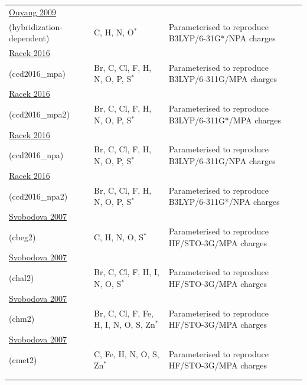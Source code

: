 \documentclass[oneside]{memoir}
\begin{document}
\begin{longtable}{p{4cm} p{3.3cm} p{8cm}}
\addlinespace[5pt]\midrule\addlinespace[5pt] \href{https://doi.org/10.1039/b821696g}{Ouyang 2009}\\(hybridization-dependent) & C, H, N, O$^{*}$ & Parameterised to reproduce B3LYP/6-31G*/NPA charges \\
\addlinespace[5pt]\midrule\addlinespace[5pt] \href{https://doi.org/10.1186/s13321-016-0171-1}{Racek 2016}\\(ccd2016\_mpa) & Br, C, Cl, F, H, N, O, P, S$^{*}$ & Parameterised to reproduce B3LYP/6-311G/MPA charges \\
\addlinespace[5pt]\midrule\addlinespace[5pt] \href{https://doi.org/10.1186/s13321-016-0171-1}{Racek 2016}\\(ccd2016\_mpa2) & Br, C, Cl, F, H, N, O, P, S$^{*}$ & Parameterised to reproduce B3LYP/6-311G*/MPA charges \\
\addlinespace[5pt]\midrule\addlinespace[5pt] \href{https://doi.org/10.1186/s13321-016-0171-1}{Racek 2016}\\(ccd2016\_npa) & Br, C, Cl, F, H, N, O, P, S$^{*}$ & Parameterised to reproduce B3LYP/6-311G/NPA charges \\
\addlinespace[5pt]\midrule\addlinespace[5pt] \href{https://doi.org/10.1186/s13321-016-0171-1}{Racek 2016}\\(ccd2016\_npa2) & Br, C, Cl, F, H, N, O, P, S$^{*}$ & Parameterised to reproduce B3LYP/6-311G*/NPA charges \\
\addlinespace[5pt]\midrule\addlinespace[5pt] \href{https://doi.org/10.3390/i8070572}{Svobodova 2007}\\(cbeg2) & C, H, N, O, S$^{*}$ & Parameterised to reproduce HF/STO-3G/MPA charges \\
\addlinespace[5pt]\midrule\addlinespace[5pt] \href{https://doi.org/10.3390/i8070572}{Svobodova 2007}\\(chal2) & Br, C, Cl, F, H, I, N, O, S$^{*}$ & Parameterised to reproduce HF/STO-3G/MPA charges \\
\addlinespace[5pt]\midrule\addlinespace[5pt] \href{https://doi.org/10.3390/i8070572}{Svobodova 2007}\\(chm2) & Br, C, Cl, F, Fe, H, I, N, O, S, Zn$^{*}$ & Parameterised to reproduce HF/STO-3G/MPA charges \\
\addlinespace[5pt]\midrule\addlinespace[5pt] \href{https://doi.org/10.3390/i8070572}{Svobodova 2007}\\(cmet2) & C, Fe, H, N, O, S, Zn$^{*}$ & Parameterised to reproduce HF/STO-3G/MPA charges \\
\addlinespace
\hline\hline
\addlinespace[5pt]\multicolumn{3}{l}{\textbf{EQeq+C}} \\\addlinespace[5pt]

\end{longtable}
\end{document}
